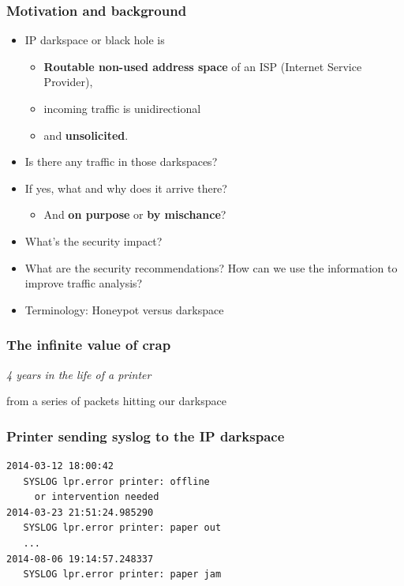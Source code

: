 \documentclass{beamer}
\begin{document}
\begin{frame}
\frametitle{Motivation and background}
\begin{itemize}
    \item IP darkspace or black hole is
    \begin{itemize}
        \item {\bf Routable non-used address space} of an ISP (Internet Service Provider),
        \item incoming traffic is unidirectional
        \item and {\bf unsolicited}.
    \end{itemize}
    \item Is there any traffic in those darkspaces?
    \item If yes, what and why does it arrive there?
    \begin{itemize}
            \item And {\bf on purpose} or {\bf by mischance}?
    \end{itemize}
    \item What's the security impact?
    \item What are the security recommendations? How can we use the information to improve traffic analysis?
    \item Terminology: Honeypot versus darkspace
\end{itemize}
\end{frame}

\begin{frame}
\frametitle{The infinite value of crap}
        {\center \it \Huge 4 years in the life of a printer\\}
        \begin{flushright}
        from a series of packets hitting our darkspace
        \end{flushright}
\end{frame}

\begin{frame}[fragile]
\frametitle{Printer sending syslog to the IP darkspace}

\begin{verbatim}
2014-03-12 18:00:42
   SYSLOG lpr.error printer: offline
     or intervention needed
2014-03-23 21:51:24.985290
   SYSLOG lpr.error printer: paper out
   ...
2014-08-06 19:14:57.248337
   SYSLOG lpr.error printer: paper jam
\end{verbatim}
\end{frame}
\end{document}
